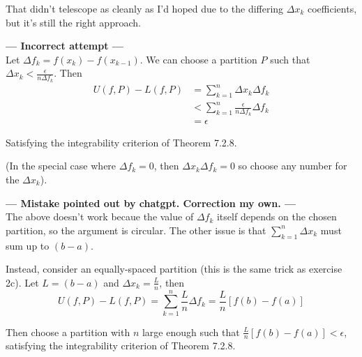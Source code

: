 \documentclass{oxmathproblems}
\begin{document}
\begin{questions}
\begin{solution}
  That didn't telescope as cleanly as I'd hoped due to the differing $\Delta{x_{k}}$ coefficients, but it's still the right approach.

  \textbf{--- Incorrect attempt ---}\\
  Let $\Delta{f_{k}} = f(x_{k})-f(x_{k-1})$. We can choose a partition $P$ such that $\Delta{x_{k}} < \frac{\epsilon}{n\Delta{f_{k}}}$. Then
  \begin{align*}
    U(f, P) -  L(f, P) &= \sum_{k=1}^{n}\Delta{x_{k}}\Delta{f_{k}}\\
    &< \sum_{k=1}^{n}\frac{\epsilon}{n\Delta{f_{k}}}\Delta{f_{k}}\\
    &= \epsilon
  \end{align*}

  Satisfying the integrability criterion of Theorem 7.2.8.

  (In the special case where $\Delta{f_{k}}=0$, then $\Delta{x_{k}}\Delta{f_{k}} = 0$ so choose any number for the $\Delta{x_{k}}$).

  \textbf{--- Mistake pointed out by chatgpt. Correction my own. ---}\\
  The above doesn't work becaue the value of $\Delta{f_{k}}$ itself depends on the chosen partition, so the argument is circular.
  The other issue is that $\sum_{k=1}^{n}\Delta{x_{k}}$ must sum up to $(b-a)$.
  
  Instead, consider an equally-spaced partition (this is the same trick as exercise 2c). Let $L=(b-a)$ and $\Delta{x_{k}}=\frac{L}{n}$, then
  \[U(f, P) - L(f, P) = \sum_{k=1}^{n}\frac{L}{n}\Delta{f_{k}} = \frac{L}{n}[f(b)-f(a)]\]

  Then choose a partition with $n$ large enough such that $\frac{L}{n}[f(b)-f(a)] < \epsilon$, satisfying the integrability criterion of Theorem 7.2.8.
\end{solution}

\end{questions}
\end{document}
